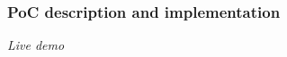 \documentclass[
    11pt, %
    aspectratio=169, %
]{beamer}
\begin{document}
\begin{frame}
	\frametitle{PoC description and implementation}
           \begin{center}
               \large\emph{Live demo}
           \end{center} 
\end{frame}
\end{document}
